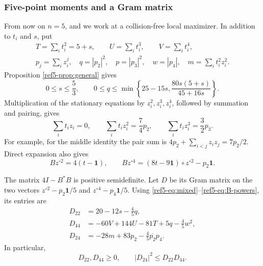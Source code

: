 \documentclass[11pt]{article}
\theoremstyle{remark}
\newcommand{\one}{\mathbf 1}
\numberwithin{equation}{section}
\begin{document}
\subsubsection{Five-point moments and a Gram matrix}
From now on $n=5$, and we work at a collision-free local maximizer.
In addition to $t_i$ and $s$, put
\begin{equation}\label{ref5-eq:notation}
\begin{gathered}
 T=\sum_i t_i^2=5+s,\qquad U=\sum_i t_i^3,\qquad V=\sum_i t_i^4,\\
 p_j=\sum_i z_i^j,\quad q=|p_2|^2,\quad p=|p_3|^2,\quad
 w=|p_4|,\quad m=\sum_i t_i^2z_i^2.
\end{gathered}
\end{equation}
Proposition \ref{ref5-prop:general} gives
\begin{equation}\label{ref5-eq:domain}
 0\le s\le\frac53,\qquad
 0\le q\le \min\left\{25-15s,\frac{80s(5+s)}{45+16s}\right\}.
\end{equation}
Multiplication of the stationary equations by $z_i^2,z_i^3,z_i^4$,
followed by summation and pairing, gives
\begin{equation}\label{ref5-eq:mixed}
 \sum_i t_i z_i=0,\qquad
 \sum_i t_i z_i^2=\frac74p_2,\qquad
 \sum_i t_i z_i^3=\frac32p_3.
\end{equation}
For example, for the middle identity the pair sum is
$4p_2+\sum_{i<j}z_i z_j=7p_2/2$.
Direct expansion also gives
\begin{equation}\label{ref5-eq:B-powers}
 Bz^{\circ2}=4(t-\one),\qquad
 Bz^{\circ4}=(8t-9\one)\circ z^{\circ2}-p_2\one.
\end{equation}

The matrix $4I-B^*B$ is positive semidefinite.
Let $D$ be its Gram matrix on the two vectors
$z^{\circ2}-p_2\one/5$ and $z^{\circ4}-p_4\one/5$.
Using \eqref{ref5-eq:mixed}--\eqref{ref5-eq:B-powers}, its entries are
\begin{equation}\label{ref5-eq:D}
\begin{aligned}
 D_{22}&=20-12s-\frac45q,\\
 D_{44}&=-60V+144U-81T+5q-\frac45w^2,\\
 D_{24}&=-28m+83p_2-\frac45\overline{p_2}p_4.
\end{aligned}
\end{equation}
In particular,
\begin{equation}\label{ref5-eq:D-psd}
 D_{22},D_{44}\ge0,\qquad |D_{24}|^2\le D_{22}D_{44}.
\end{equation}
\end{document}
